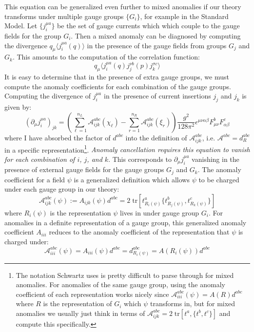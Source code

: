 \documentclass[11pt, oneside]{article}   	%
\theoremstyle{definition}
\numberwithin{equation}{subsection}		%
\begin{document}
This equation can be generalized even further to mixed anomalies if our theory transforms under multiple gauge groups $\{G_i\}$, for example in the Standard Model. 
Let $\{j_i^{\mu a}\}$ be the set of gauge currents which which couple to the gauge fields for the group $G_i$. Then a mixed anomaly can be diagnosed by computing 
the divergence $q_\mu\langle j_i^{\mu a}(q)\rangle$ in the presence of the gauge fields from groups $G_j$ and $G_k$. This amounts to the computation of the correlation 
function:
\begin{equation}
	q_\mu \langle j^{\mu a}_i(q) j_j^{\nu b}(p) j_k^{\sigma c}\rangle
\end{equation}
It is easy to determine that in the presence of extra gauge groups, we must compute the anomaly coefficients for each combination of the gauge groups. Computing 
the divergence of $j_i^{\mu a}$ in the presence of current insertions $j_j$ and $j_k$ is given by:
\begin{equation}
	\left(\partial_\mu j_i^{\mu a}\right)_{jk} = \left(\sum_{\ell = 1}^{n_L} \mathcal A_{ijk}^{abc}(\chi_\ell) - \sum_{r = 1}^{n_R} \mathcal A_{ijk}^{abc}(\xi_r)\right)\frac{g^2}{128\pi^2} \epsilon^{\mu\nu\alpha\beta}
	F_{\mu\nu}^b F_{\alpha\beta}^c
	\label{eq:mixed_anomaly}
\end{equation}
where I have absorbed the factor of $d^{abc}$ into the definition of $\mathcal A_{ijk}^{abc}$, i.e. $\mathcal A^{abc} = d_R^{abc}$ in a specific representation\footnote{The 
notation Schwartz uses is pretty difficult to parse through for mixed anomalies. For anomalies of the same gauge group, using the anomaly coefficient of each 
representation works nicely since $\mathcal A_{iii}^{abc}(\psi) = A(R) d^{abc}$ where $R$ is the representation of $G_i$ which $\psi$ transforms in, but for mixed anomalies 
we usually just think in terms of $\mathcal A_{ijk}^{abc} = 2\;\mathrm{tr}[t^a, \{t^b, t^c\}]$ and compute this specifically.}.
\textit{Anomaly cancellation requires this equation to vanish for each combination of $i$, $j$, and $k$}. This corresponds to $\partial_\mu j_i^{\mu a}$ vanishing in the 
presence of external gauge fields for the gauge groups $G_j$ and $G_k$. The anomaly coefficient for a field $\psi$ is a generalized definition which 
allows $\psi$ to be charged under each gauge group in our theory:
\begin{equation}
	\mathcal A_{ijk}^{abc}(\psi) := A_{ijk}(\psi) d^{abc} = 2\;\mathrm{tr}\left[t^a_{R_i(\psi)} \{ t^b_{R_j(\psi)}, t^c_{R_k(\psi)} \}\right]
\end{equation}
where $R_i(\psi)$ is the representation $\psi$ lives in under gauge group $G_i$. For anomalies in a definite representation of a gauge group, this generalized 
anomaly coefficient $A_{iii}$ reduces to the anomaly coefficient of the representation that $\psi$ is charged under:
\begin{equation}
	\mathcal A_{iii}^{abc}(\psi) = A_{iii}(\psi) d^{abc} = d_{R_i(\psi)}^{abc} = A(R_i(\psi)) d^{abc}
\end{equation}
\end{document}
